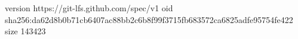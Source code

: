 version https://git-lfs.github.com/spec/v1
oid sha256:da62d8b0b71cb6407ac88bb2c6b8f99f3715fb683572ca6825adfe95754fe422
size 143423

